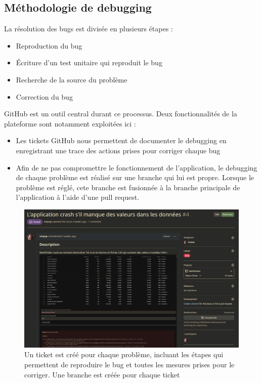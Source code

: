 \documentclass[french]{article}
\begin{document}
    \subsection{Méthodologie de debugging}
    La résolution des bugs est divisée en plusieurs étapes :
    \begin{itemize}
        \item Reproduction du bug
        \item Écriture d'un test unitaire qui reproduit le bug
        \item Recherche de la source du problème
        \item Correction du bug
    \end{itemize}
    GitHub est un outil central durant ce processus. Deux fonctionnalités de la plateforme sont notamment exploitées ici :
    \begin{itemize}
        \item Les tickets GitHub nous permettent de documenter le debugging en enregistrant une trace des actions prises pour corriger chaque bug
        \item Afin de ne pas compromettre le fonctionnement de l'application, le debugging de chaque problème est réalisé sur une branche qui lui est propre. Lorsque le problème est réglé, cete branche est fusionnée à la branche principale de l'application à l'aide d'une pull request.
    \end{itemize}
    \begin{figure}[h]
        \includegraphics[width=12cm]{gh_issue}
        \centering
        \caption{Un ticket est créé pour chaque problème, incluant les étapes qui permettent de reproduire le bug et toutes les mesures prises pour le corriger. Une branche est créée pour chaque ticket}
        \centering
    \end{figure}
\end{document}

